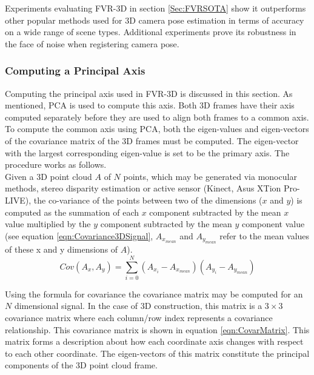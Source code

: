 Experiments evaluating FVR-3D in section \ref{Sec:FVRSOTA} show it outperforms other popular methods used for 3D camera pose estimation in terms of accuracy on a wide range of scene types. Additional experiments prove its robustness in the face of noise when registering camera pose. \\

\subsubsection{Computing a Principal Axis}

Computing the principal axis used in FVR-3D is discussed in this section. As mentioned, PCA is used to compute this axis. Both 3D frames have their axis computed separately before they are used to align both frames to a common axis. To compute the common axis using PCA, both the eigen-values and eigen-vectors of the covariance matrix of the 3D frames must be computed. The eigen-vector with the largest corresponding eigen-value is set to be the primary axis. The procedure works as follows. \\

Given a 3D point cloud $A$ of $N$ points, which may be generated via monocular methods, stereo disparity estimation or active sensor (Kinect, Asus XTion Pro-LIVE), the co-variance of the points between two of the dimensions ($x$ and $y$) is computed as the summation of each $x$ component subtracted by the mean $x$ value multiplied by the $y$ component subtracted by the mean $y$ component value (see equation \ref{eqn:Covariance3DSignal}, $A_{x_{mean}}$ and $A_{y_{mean}}$ refer to the mean values of these x and y dimensions of $A$). \\

\begin{equation} \label{eqn:Covariance3DSignal}
Cov(A_x,A_y) = \sum_{i=0}^{N}(A_{x_i} - A_{x_{mean}})(A_{y_i} - A_{y_{mean}})
\end{equation}

Using the formula for covariance the covariance matrix may be computed for an $N$ dimensional signal. In the case of 3D construction, this matrix is a $3 \times 3$ covariance matrix where each column/row index represents a covariance relationship. This covariance matrix is shown in equation \ref{eqn:CovarMatrix}. This matrix forms a description about how each coordinate axis changes with respect to each other coordinate. The eigen-vectors of this matrix constitute the principal components of the 3D point cloud frame. \\

